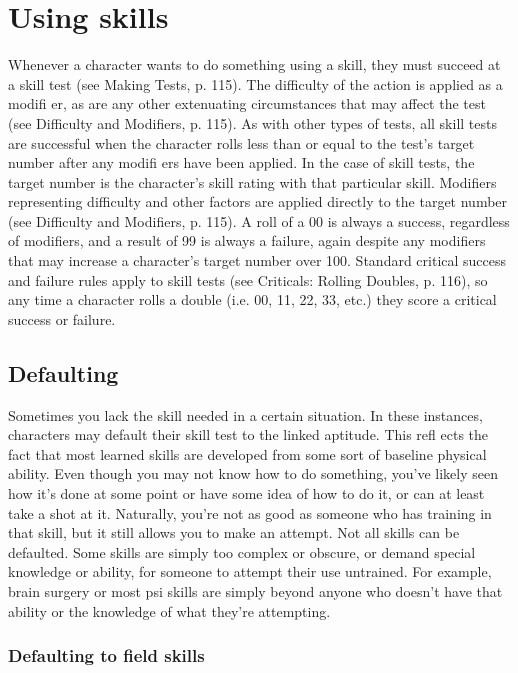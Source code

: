 \section{Using skills}
\label{sec:skills:using-skills}

Whenever a character wants to do something using a skill, they must succeed at a skill test (see Making Tests, p. 115). The difficulty of the action is applied as a modifi er, as are any other extenuating circumstances that may affect the test (see Difficulty and Modifiers, p. 115). As with other types of tests, all skill tests are successful when the character rolls less than or equal to the test’s target number after any modifi ers have been applied. In the case of skill tests, the target number is the character’s skill rating with that particular skill. Modifiers representing difficulty and other factors are applied directly to the target number (see Difficulty and Modifiers, p. 115). A roll of a 00 is always a success, regardless of modifiers, and a result of 99 is always a failure, again despite any modifiers that may increase a character’s target number over 100. Standard critical success and failure rules apply to skill tests (see Criticals: Rolling Doubles, p. 116), so any time a character rolls a double (i.e. 00, 11, 22, 33, etc.) they score a critical success or failure.


\subsection{Defaulting}
\label{sec:skills:defaulting}

Sometimes you lack the skill needed in a certain situation. In these instances, characters may default their skill test to the linked aptitude. This refl ects the fact that most learned skills are developed from some sort of baseline physical ability. Even though you may not know how to do something, you’ve likely seen how it’s done at some point or have some idea of how to do it, or can at least take a shot at it. Naturally, you’re not as good as someone who has training in that skill, but it still allows you to make an attempt. Not all skills can be defaulted. Some skills are simply too complex or obscure, or demand special knowledge or ability, for someone to attempt their use untrained. For example, brain surgery or most psi skills are simply beyond anyone who doesn’t have that ability or the knowledge of what they’re attempting.


\subsubsection{Defaulting to field skills}
\label{sec:skills:defaulting-to-field-skills}

